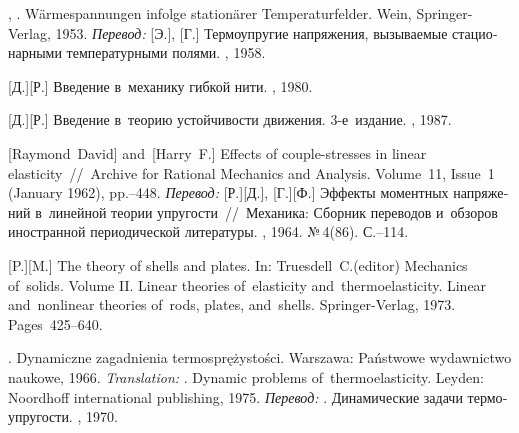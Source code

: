 \begin{thebibliography}{123}
\begin{otherlanguage}{russian}

, . Wärmespannungen infolge stationärer Temperaturfelder. Wein, Springer-Verlag, 1953. 
\emph{Перевод:} [Э.], [Г.] Термоупругие напряжения, вызываемые стационарными температурными полями. \fizmatgiz, 1958. 

[Д.][Р.] Введение в~механику гибкой нити. \naukapublisher, 1980. 

[Д.][Р.] Введение в~теорию устойчивости движения. 3\hbox{-}е~издание. \naukapublisher, 1987. 

[Raymond~David] %
and~[Harry~F.] %
Effects of couple-stresses in linear elasticity~//~Archive for Rational Mechanics and Analysis. Volume~11, Issue~1 (January 1962), pp.\hbox{--}448.
\emph{Перевод:}
[Р.][Д.], [Г.][Ф.]
Эффекты моментных напряжений в~линейной теории упругости~//~Механика: Сборник переводов и~обзоров иностранной периодической литературы. \mirpublisher, 1964. №\,4\:(86). С.\hbox{--}114.

[P.][M.] The theory of shells and plates. In: Truesdell~C.\:(editor) Mechanics of~solids. Volume II. Linear theories of~elasticity and~thermoelasticity. Linear and~nonlinear theories of~rods, plates, and~shells. Springer\hbox{-}Verlag, 1973. Pages~425\hbox{--}640.

.
Dynamiczne zagadnienia termosprężystości.
Warsza\-wa: Państwowe wydawnictwo naukowe, 1966. 
\emph{Translation:}
.
Dynamic problems of~thermoelasticity.
Leyden: Noordhoff international publishing, 1975.
\emph{Перевод:}
.
Динамические задачи термоупругости.
\mirpublisher, 1970.


\end{otherlanguage}
\end{thebibliography}
